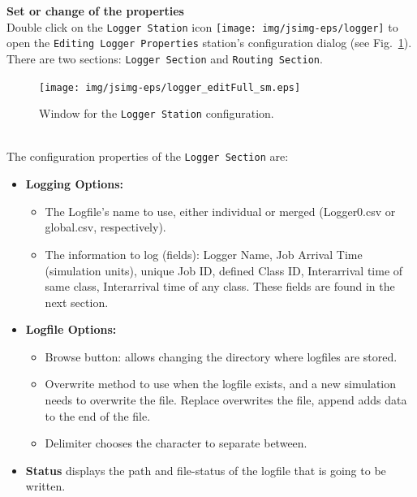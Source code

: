 \noindent \textbf{Set or change of the properties}\\
Double click on the \texttt{Logger Station} icon
\texttt{[image: img/jsimg-eps/logger]}
to open the \texttt{Editing Logger Properties} station's
configuration dialog (see Fig.~\ref{fig:deditlogg}). There are two
sections:
\texttt{Logger Section} and \texttt{Routing Section}.\\
\begin{figure}[htb]
    \begin{center}
        \texttt{[image: img/jsimg-eps/logger\_editFull\_sm.eps]}
    \end{center}
    \caption{Window for the \texttt{Logger Station} configuration.}
    \label{fig:deditlogg}
\end{figure}

\\
The configuration properties of the \texttt{Logger Section} are:
\begin{itemize} \item \textbf{Logging Options:}
\begin{itemize} \item   The Logfile's name to use, either individual or merged
(Logger0.csv or global.csv, respectively). \item The information
to log (fields): Logger Name, Job Arrival Time (simulation units),
unique Job ID, defined Class ID, Interarrival time of same class,
Interarrival time of any class. These fields are found in the next
section. \end{itemize} \item \textbf{Logfile Options:}
\begin{itemize} \item Browse button: allows changing the directory where
logfiles are stored. \item Overwrite method to use when the
logfile exists, and a new simulation needs to overwrite the file.
Replace overwrites the file, append adds data to the end of the
file. \item Delimiter chooses the character to separate between.
\end{itemize}
\item \textbf{Status} displays the path and file-status of the
logfile that is going to be written.
\end{itemize}

